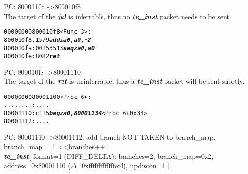 \begin{enumerate}
  \begin{frame}

  PC: 8000110c -\textgreater 800010f8\\
  The target of the \textbf{\textit{jal}} is inferrable, thus no \textbf{\textit{te\_inst}} packet needs to be sent.
  \end{frame}
  

\begin {alltt}
00000000800010f8 <Func\_3>:
    800010f8:	1579                    \textbf{\textit{addi	a0,a0,-2}}
    800010fa:	00153513                \textbf{\textit{seqz	a0,a0}}
    800010fe:	8082                    \textbf{\textit{ret}}
\end{alltt}

  \begin{frame}

  PC: 800010fe -\textgreater 80001110\\
  The target of the \textbf{\textit{ret}} is uninferrable, thus a \textbf{\textit{te\_inst}} packet will be sent shortly.
  \end{frame}
  
\begin{alltt}
  
0000000080001100 <Proc\_6>:
    ........:   ....
    80001110:	c115                	\textbf{\textit{beqz	a0,80001134}} <Proc\_6+0x34>
    80001112:	....
\end{alltt}

  \begin{frame}

  PC: 80001110 -\textgreater 80001112, add branch NOT TAKEN to branch\_map.\\
  branch\_map \textbar= 1 \textless\textless branches++;\\
  \textbf{\textit{te\_inst}}[ format=1 (DIFF\_DELTA): branches=2, branch\_map=0x2, address=0x80001110 ($\Delta$=0xfffffffffffffef4), updiscon=1 ]
  \end{frame}
  
  
\end{enumerate}

